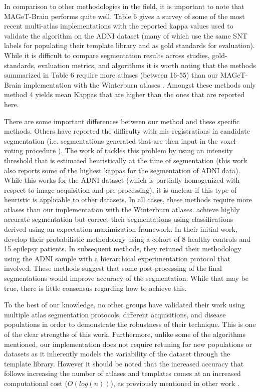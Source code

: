 \documentclass{article}\usepackage{graphicx, color}
\newcommand{\mb}{MAGeT-Brain }
\begin{document}

In comparison to other methodologies in the field, it is important to note that
\mb performs quite well.  Table 6 gives a survey of some of the most recent
multi-atlas implementations with the reported kappa values used to validate the
algorithm on the ADNI dataset (many of which use the same SNT labels for
populating their template library and as gold standards for evaluation).  While
it is difficult to compare segmentation results across studies, gold-standards,
evaluation metrics, and algorithms it is worth noting that the methods
summarized in Table 6 require more atlases (between 16-55) than our \mb
implementation with the Winterburn atlases \citep{Winterburn2013}.  Amongst these
methods only method 4 yields mean Kappas that are higher than the ones that are
reported here.  

There are some important differences between our method
and these specific methods.  Others have reported the difficulty with
mis-registrations in candidate segmentation (i.e. segmentations generated that are
then input in the voxel-voting procedure \citep{Collins2010}). The work of 
\citet{Leung2010} tackles this problem by using an intensity threshold
that is estimated heuristically at the time of segmentation (this work also
reports some of the highest kappas for the segmentation of ADNI data).  While
this works for the ADNI dataset (which is partially homogenized with respect to
image acquisition and pre-processing), it is unclear if this type of heuristic
is applicable to other datasets.  In all cases, these methods require more
atlases than our implementation with the Winterburn atlases.
\citet{Lotjonen2010} achieve highly accurate segmentation but correct their
segmentations using classifications derived using an expectation maximization
framework.  In their initial work, \citet{Chupin2009} develop their
probabilistic methodology using a cohort of 8 healthy controls and 15 epilepsy
patients.  In subsequent methods, they retuned their methodology using the ADNI
sample with a hierarchical experimentation protocol that involved.  These
methods suggest that some post-processing of the final segmentations would
improve accuracy of the segmentation.  While that may be true, there is little
consensus regarding how to achieve this.  

To the best of our knowledge, no other groups have validated their work using
multiple atlas segmentation protocols, different acquisitions, and disease
populations in order to demonstrate the robustness of their technique.  This is
one of the clear strengths of this work.  Furthermore, unlike some of the
algorithms mentioned, our implementation does not require retuning for new
populations or datasets as it inherently models the variability of the dataset
through the template library.  However it should be noted that the increased
accuracy that follows increasing the number of atlases and templates comes at an
increased computational cost ($O(log(n))$), as previously mentioned in
other work \citep{Heckemann2006}. 
\end{document}
